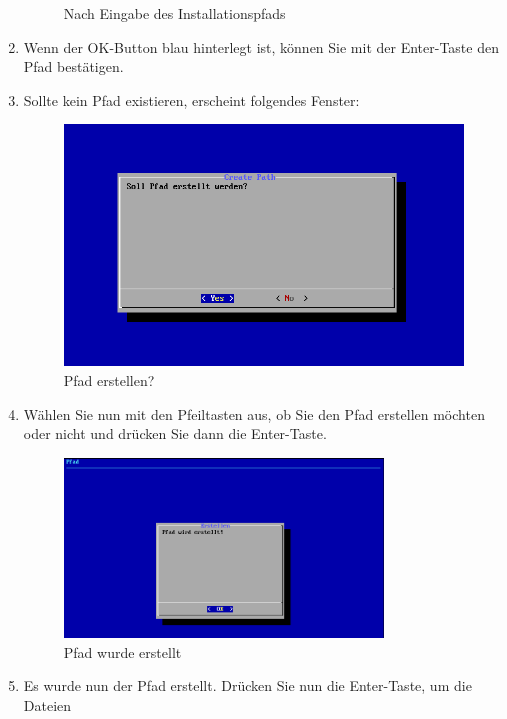 \documentclass[12pt]{scrartcl}
\begin{document}
\begin{enumerate}
\begin{figure}[htbp]
\caption{Nach Eingabe des Installationspfads}
\label{fig:script3}
\end{figure}
\item Wenn der OK-Button blau hinterlegt ist, können Sie mit
der Enter-Taste den Pfad bestätigen. 
\newpage
\item Sollte kein Pfad existieren, erscheint folgendes Fenster:
\begin{figure}[htbp]
\centering
\includegraphics[width=1.0\textwidth]{schritt4}\par\vspace{0.5cm}
\caption{Pfad erstellen?}
\label{fig:script4}
\end{figure}
\item Wählen Sie nun mit den Pfeiltasten aus, ob Sie den Pfad erstellen möchten
oder nicht und drücken Sie dann die Enter-Taste.
\begin{figure}[htbp]
\centering
\includegraphics[width=0.8\textwidth]{schritt5}\par\vspace{0.5cm}
\caption{Pfad wurde erstellt}
\label{fig:script5}
\end{figure}
\newpage
\item Es wurde nun der Pfad erstellt. Drücken Sie nun die Enter-Taste, um die Dateien

\end{enumerate}
\end{document}
